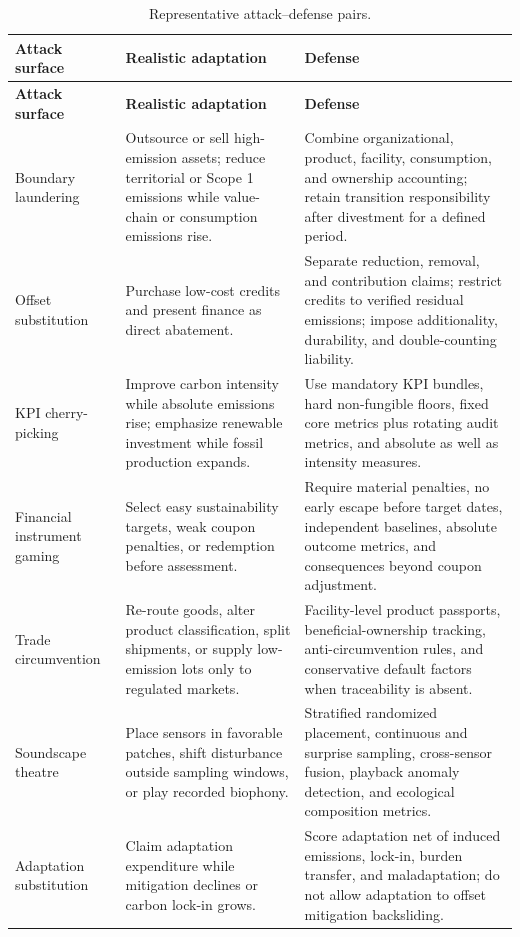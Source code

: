 \documentclass[11pt,a4paper]{article}
\numberwithin{equation}{section}
\theoremstyle{definition}
\theoremstyle{plain}
\theoremstyle{remark}
\begin{document}
\begin{longtable}{@{}L{0.17\textwidth}L{0.34\textwidth}L{0.41\textwidth}@{}}
\caption{Representative attack--defense pairs.}\label{tab:redteam}\\
\toprule
\textbf{Attack surface} & \textbf{Realistic adaptation} & \textbf{Defense} \\
\midrule
\endfirsthead
\toprule
\textbf{Attack surface} & \textbf{Realistic adaptation} & \textbf{Defense} \\
\midrule
\endhead
Boundary laundering & Outsource or sell high-emission assets; reduce territorial or Scope 1 emissions while value-chain or consumption emissions rise. & Combine organizational, product, facility, consumption, and ownership accounting; retain transition responsibility after divestment for a defined period. \\
\addlinespace
Offset substitution & Purchase low-cost credits and present finance as direct abatement. & Separate reduction, removal, and contribution claims; restrict credits to verified residual emissions; impose additionality, durability, and double-counting liability. \\
\addlinespace
KPI cherry-picking & Improve carbon intensity while absolute emissions rise; emphasize renewable investment while fossil production expands. & Use mandatory KPI bundles, hard non-fungible floors, fixed core metrics plus rotating audit metrics, and absolute as well as intensity measures. \\
\addlinespace
Financial instrument gaming & Select easy sustainability targets, weak coupon penalties, or redemption before assessment. & Require material penalties, no early escape before target dates, independent baselines, absolute outcome metrics, and consequences beyond coupon adjustment. \\
\addlinespace
Trade circumvention & Re-route goods, alter product classification, split shipments, or supply low-emission lots only to regulated markets. & Facility-level product passports, beneficial-ownership tracking, anti-circumvention rules, and conservative default factors when traceability is absent. \\
\addlinespace
Soundscape theatre & Place sensors in favorable patches, shift disturbance outside sampling windows, or play recorded biophony. & Stratified randomized placement, continuous and surprise sampling, cross-sensor fusion, playback anomaly detection, and ecological composition metrics. \\
\addlinespace
Adaptation substitution & Claim adaptation expenditure while mitigation declines or carbon lock-in grows. & Score adaptation net of induced emissions, lock-in, burden transfer, and maladaptation; do not allow adaptation to offset mitigation backsliding. \\

\end{longtable}
\end{document}

